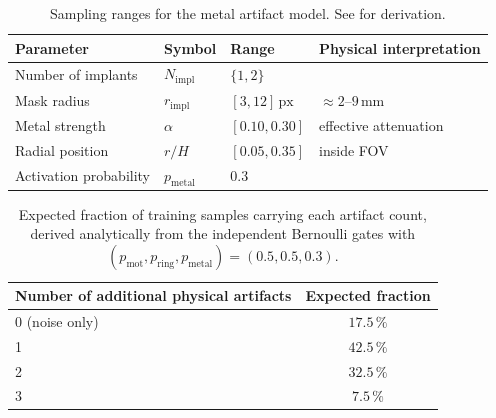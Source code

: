 \begin{table}[!htb]
    \centering
    \caption[Metal artifact parameters (reproduced from ).]{%
        Sampling ranges for the metal artifact model. See  for derivation.}
    \label{tab:app_metal_params}
    \setlength{\tabcolsep}{4pt}
    \small
    \begin{tabular}{@{}llll@{}}
        \toprule
        Parameter & Symbol & Range & Physical interpretation \\
        \midrule
        Number of implants      & $N_\mathrm{impl}$  & $\{1,2\}$           & \\
        Mask radius             & $r_\mathrm{impl}$  & $[3,12]\,\text{px}$ & $\approx2$--$9\,\text{mm}$ \\
        Metal strength          & $\alpha$           & $[0.10,0.30]$       & effective attenuation \\
        Radial position         & $r/H$              & $[0.05,0.35]$       & inside FOV \\
        Activation probability  & $p_\mathrm{metal}$ & $0.3$               & \\
        \bottomrule
    \end{tabular}
\end{table}
\FloatBarrier
\begin{table}[!htb]
    \centering
    \caption[Expected compound artifact distribution.]{%
        Expected fraction of training samples carrying each artifact count, derived analytically
        from the independent Bernoulli gates with
        $(p_\mathrm{mot}, p_\mathrm{ring}, p_\mathrm{metal}) = (0.5, 0.5, 0.3)$.}
    \label{tab:app_compound_probs}
    \begin{tabular}{lc}
        \toprule
        Number of additional physical artifacts & Expected fraction \\
        \midrule
        0 (noise only)  & $17.5\,\%$ \\
        1               & $42.5\,\%$ \\
        2               & $32.5\,\%$ \\
        3               & $7.5\,\%$  \\
        \bottomrule
    \end{tabular}
\end{table}

